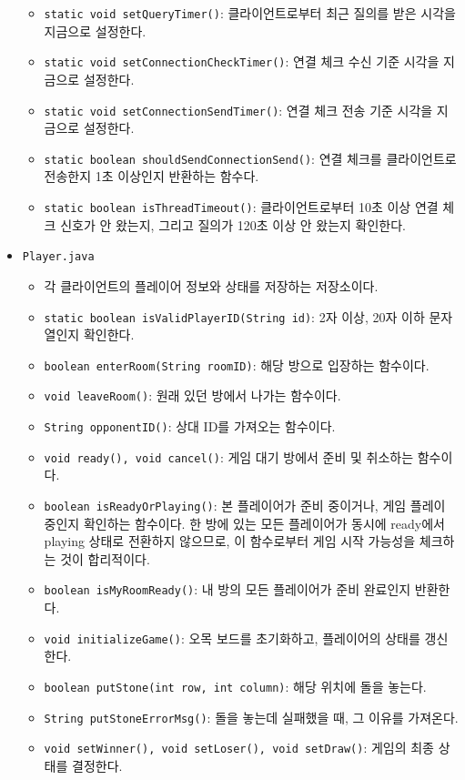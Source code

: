 \documentclass[a4paper, 10pt]{article}
\begin{document}
\begin{itemize}
\begin{itemize}
    \item \texttt{static void setQueryTimer()}: 클라이언트로부터 최근 질의를 받은 시각을 지금으로 설정한다.
    \item \texttt{static void setConnectionCheckTimer()}: 연결 체크 수신 기준 시각을 지금으로 설정한다.
    \item \texttt{static void setConnectionSendTimer()}: 연결 체크 전송 기준 시각을 지금으로 설정한다.
    \item \texttt{static boolean shouldSendConnectionSend()}: 연결 체크를 클라이언트로 전송한지 1초 이상인지 반환하는 함수다.
    \item \texttt{static boolean isThreadTimeout()}: 클라이언트로부터 10초 이상 연결 체크 신호가 안 왔는지, 그리고 질의가 120초 이상 안 왔는지 확인한다.
  \end{itemize}
  \item \texttt{Player.java}
  \begin{itemize}
    \item[] 각 클라이언트의 플레이어 정보와 상태를 저장하는 저장소이다.
    \item \texttt{static boolean isValidPlayerID(String id)}: 2자 이상, 20자 이하 문자열인지 확인한다.
    \item \texttt{boolean enterRoom(String roomID)}: 해당 방으로 입장하는 함수이다.
    \item \texttt{void leaveRoom()}: 원래 있던 방에서 나가는 함수이다.
    \item \texttt{String opponentID()}: 상대 ID를 가져오는 함수이다.
    \item \texttt{void ready(), void cancel()}: 게임 대기 방에서 준비 및 취소하는 함수이다.
    \item \texttt{boolean isReadyOrPlaying()}: 본 플레이어가 준비 중이거나, 게임 플레이 중인지 확인하는 함수이다.
    한 방에 있는 모든 플레이어가 동시에 ready에서 playing 상태로 전환하지 않으므로, 이 함수로부터 게임 시작 가능성을
    체크하는 것이 합리적이다.
    \item \texttt{boolean isMyRoomReady()}: 내 방의 모든 플레이어가 준비 완료인지 반환한다.
    \item \texttt{void initializeGame()}: 오목 보드를 초기화하고, 플레이어의 상태를 갱신한다.
    \item \texttt{boolean putStone(int row, int column)}: 해당 위치에 돌을 놓는다.
    \item \texttt{String putStoneErrorMsg()}: 돌을 놓는데 실패했을 때, 그 이유를 가져온다.
    \item \texttt{void setWinner(), void setLoser(), void setDraw()}: 게임의 최종 상태를 결정한다.

\end{itemize}
\end{itemize}
\end{document}
